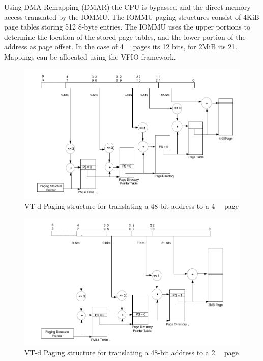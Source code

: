 Using DMA Remapping (DMAR) the CPU is bypassed and the direct memory access translated by the IOMMU.
The IOMMU paging structures consist of 4KiB page tables storing 512 8-byte entries. The IOMMU uses the upper portions to determine the location of the stored page tables, and the lower portion of the address as page offset. In the case of \qty{4}{\kibi\byte} pages its 12 bits, for 2MiB its 21.
Mappings can be allocated using the VFIO framework.

\begin{figure}
    \centering
    \includegraphics[width=\textwidth]{figures/4kibtranslation.pdf}
    \caption{VT-d Paging structure for translating a 48-bit address to a \qty{4}{\kibi\byte} page}
    \label{fig:pagewalk4kib}
\end{figure}
\begin{figure}
    \centering
    \includegraphics[width=\textwidth]{figures/2mibtranslation.pdf}
    \caption{VT-d Paging structure for translating a 48-bit address to a \qty{2}{\mebi\byte} page}
    \label{fig:pagewalk2mib}
\end{figure}

